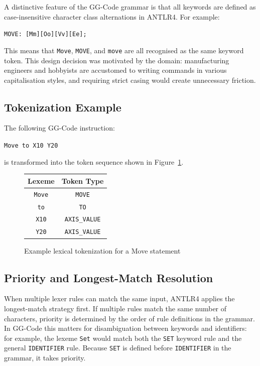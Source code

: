 A distinctive feature of the GG-Code grammar is that all keywords are defined as case-insensitive character class alternations in ANTLR4. For example:

\begin{center}
\verb|MOVE: [Mm][Oo][Vv][Ee];|
\end{center}

This means that \texttt{Move}, \texttt{MOVE}, and \texttt{move} are all recognised as the same keyword token. This design decision was motivated by the domain: manufacturing engineers and hobbyists are accustomed to writing commands in various capitalisation styles, and requiring strict casing would create unnecessary friction.

\subsection*{Tokenization Example}

The following GG-Code instruction:

\begin{center}
\verb|Move to X10 Y20|
\end{center}

is transformed into the token sequence shown in Figure~\ref{fig:lexer-example}.

\begin{figure}[H]
\centering
\begin{tabular}{|c|c|}
\hline
\textbf{Lexeme} & \textbf{Token Type} \\
\hline
\texttt{Move}  & \texttt{MOVE} \\
\texttt{to}    & \texttt{TO} \\
\texttt{X10}   & \texttt{AXIS\_VALUE} \\
\texttt{Y20}   & \texttt{AXIS\_VALUE} \\
\hline
\end{tabular}
\caption{Example lexical tokenization for a Move statement}
\label{fig:lexer-example}
\end{figure}

\subsection*{Priority and Longest-Match Resolution}

When multiple lexer rules can match the same input, ANTLR4 applies the longest-match strategy first. If multiple rules match the same number of characters, priority is determined by the order of rule definitions in the grammar. In GG-Code this matters for disambiguation between keywords and identifiers: for example, the lexeme \texttt{Set} would match both the \texttt{SET} keyword rule and the general \texttt{IDENTIFIER} rule. Because \texttt{SET} is defined before \texttt{IDENTIFIER} in the grammar, it takes priority.

